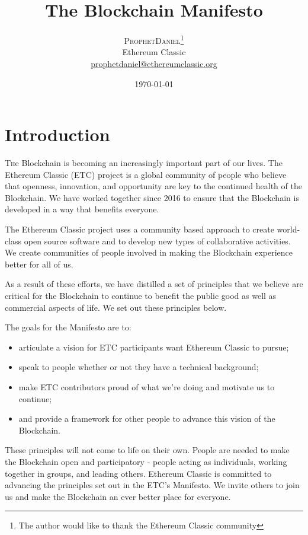 \documentclass[twoside,twocolumn]{article}
\title{The Blockchain Manifesto} %
\author{%
\textsc{ProphetDaniel}\thanks{The author would like to thank the Ethereum Classic community} \\[1ex] %
\normalsize Ethereum Classic \\ %
\normalsize
\href{mailto:prophetdaniel@ethereumclassic.org}{prophetdaniel@ethereumclassic.org}
}
\date{\today} %
\begin{document}
\maketitle

\section{Introduction}

\lettrine[nindent=0em,lines=3]{T}he Blockchain is becoming an increasingly
important part of our lives. The Ethereum Classic (ETC) project is a global
community of people who believe that openness, innovation, and opportunity are
key to the continued health of the Blockchain. We have worked together since
2016 to ensure that the Blockchain is developed in a way that benefits everyone.

The Ethereum Classic project uses a community based approach to create
world-class open source software and to develop new types of collaborative
activities. We create communities of people involved in making the Blockchain
experience better for all of us.

As a result of these efforts, we have distilled a set of principles that we
believe are critical for the Blockchain to continue to benefit the public good
as well as commercial aspects of life. We set out these principles below.

The goals for the Manifesto are to:

\begin{itemize}
  \item articulate a vision for ETC participants want
  Ethereum Classic to pursue;
  \item speak to people whether or not they have a technical
background;
  \item make ETC contributors proud of what we're doing and motivate us
to continue;
  \item and provide a framework for other people to advance this vision of
the Blockchain.
\end{itemize}

These principles will not come to life on their own. People are needed to make
the Blockchain open and participatory - people acting as individuals, working
together in groups, and leading others. Ethereum Classic is
committed to advancing the principles set out in the ETC's Manifesto. We
invite others to join us and make the Blockchain an ever better place for
everyone.
\end{document}
